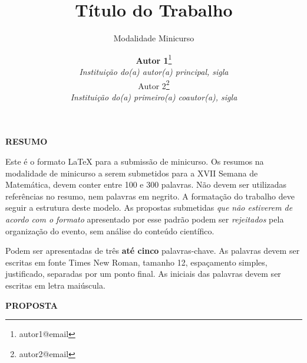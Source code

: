 \documentclass{semat}
\begin{document}

\title{\textbf{Título do Trabalho}}
\subtitle{Modalidade Minicurso} %

\author{
    {\large \textbf {Autor 1}}\thanks{autor1@email}\\ 
    {\small \textit{Instituição do(a) autor(a) principal, sigla}} \\
    {\large Autor 2}\thanks{autor2@email}\\
    {\small \textit{Instituição do(a) primeiro(a) coautor(a), sigla}} 
}
\criartitulo

\begin{center}
\textbf{RESUMO}
\end{center}
\noindent Este é o formato \LaTeX{} para a submissão de minicurso. Os resumos na modalidade de minicurso a serem submetidos para a XVII Semana de Matemática, devem conter entre 100 e 300 palavras. Não devem ser utilizadas referências no resumo, nem palavras em negrito. A formatação do trabalho deve seguir a estrutura deste modelo. As propostas submetidas \emph{que não estiverem de acordo com o formato} apresentado por esse padrão podem ser \emph{rejeitados} pela organização do evento, sem análise do conteúdo científico.
\vspace{1.5em}

 Podem ser apresentadas de três \textbf{até cinco} palavras-chave. As palavras devem ser escritas em fonte Times New Roman, tamanho 12, espaçamento simples, justificado, separadas por um ponto final. As iniciais das palavras devem ser escritas em letra maiúscula.
\vspace{1.5em}


\vspace{1.5em}
\begin{center}
\textbf{PROPOSTA}
\end{center}
\end{document}
